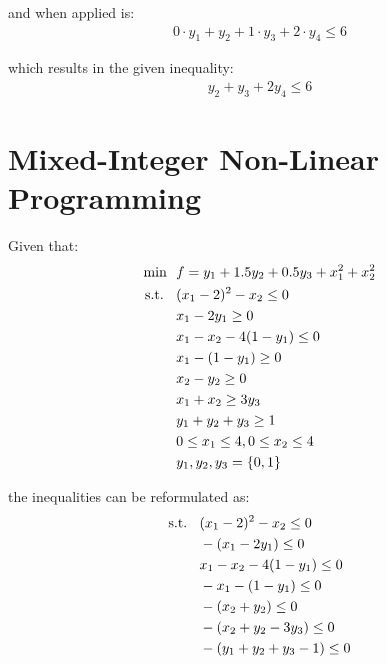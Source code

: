 \documentclass{article}
\begin{document}
and when applied is:
\begin{equation}
\begin{split}
    0 \cdot y_1 + y_2 + 1 \cdot y_3 + 2 \cdot y_4 \leq 6
\end{split}
\end{equation}

which results in the given inequality:
\begin{equation}
\begin{split}
    y_2 + y_3 + 2y_4 \leq 6
\end{split}
\end{equation}

\section*{Mixed-Integer Non-Linear Programming}
Given that:
\begin{equation}
\begin{split}
    \text{min \space} & f = y_1 + 1.5y_2 + 0.5y_3 + x_{1}^{2} + x_{2}^{2}\\
    \text{s.t. \space} 
    & \space (x_1 - 2)^2 -x_2 \leq 0\\
    & x_1 - 2y_1 \geq 0\\
    & x_1 - x_2 - 4(1-y_1) \leq 0\\
    & x_1 - (1 - y_1) \geq 0\\
    & x_2 - y_2 \geq 0\\
    & x_1 + x_2 \geq 3y_3\\
    & y_1 + y_2 + y_3 \geq 1\\
    & 0 \leq x_1 \leq 4, 0 \leq x_2 \leq 4\\
    & y_1, y_2, y_3 = \{0, 1\}\\
\end{split}
\end{equation}

the inequalities can be reformulated as:
\begin{equation}
\begin{split}
    \text{s.t. \space} 
    & \space (x_1 - 2)^2 -x_2 \leq 0\\
    & -(x_1 - 2y_1) \leq 0\\
    & x_1 - x_2 - 4(1-y_1) \leq 0\\
    & - x_1 - (1 - y_1) \leq 0\\
    & - (x_2 + y_2) \leq 0\\
    & - (x_2 + y_2 - 3y_3)\leq 0\\
    & - (y_1 + y_2 + y_3 - 1) \leq 0
\end{split}
\end{equation}
\end{document}
